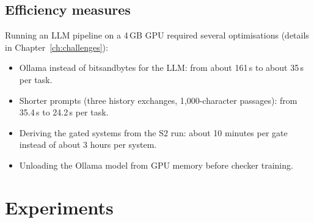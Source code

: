 \documentclass[11pt,a4paper]{report}
\newcommand{\sys}[1]{\textsf{#1}}
\begin{document}
\section{Efficiency measures}
Running an LLM pipeline on a 4\,GB GPU required several optimisations (details in Chapter~\ref{ch:challenges}):
\begin{itemize}
\item Ollama instead of bitsandbytes for the LLM: from about 161\,s to about 35\,s per task.
\item Shorter prompts (three history exchanges, 1{,}000-character passages): from 35.4\,s to 24.2\,s per task.
\item Deriving the gated systems from the \sys{S2} run: about 10 minutes per gate instead of about 3 hours per system.
\item Unloading the Ollama model from GPU memory before checker training.
\end{itemize}

\chapter{Experiments}
\end{document}
